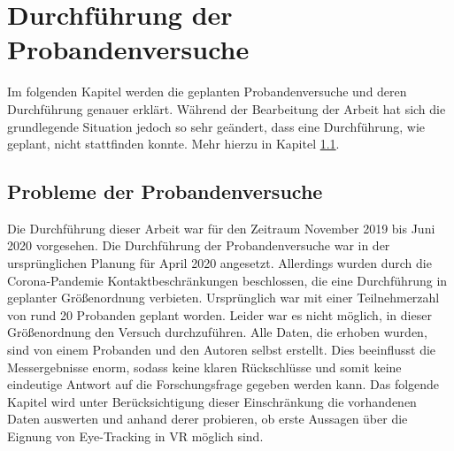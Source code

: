 
\chapter{Durchführung  der Probandenversuche} 
Im folgenden Kapitel werden die geplanten Probandenversuche und deren Durchführung genauer erklärt. Während der Bearbeitung der Arbeit hat sich die grundlegende Situation jedoch so sehr geändert, dass eine Durchführung, wie geplant, nicht stattfinden konnte. Mehr hierzu in Kapitel \ref{section:corona}.
\section{Probleme der Probandenversuche}
\label{section:corona}
Die Durchführung dieser Arbeit war für den Zeitraum November 2019 bis Juni 2020 vorgesehen. Die Durchführung der Probandenversuche war in der ursprünglichen Planung für April 2020 angesetzt. Allerdings wurden durch die Corona-Pandemie  Kontaktbeschränkungen beschlossen, die eine Durchführung in geplanter Größenordnung verbieten. Ursprünglich war mit einer Teilnehmerzahl von rund 20 Probanden geplant worden. Leider war es nicht möglich, in dieser Größenordnung den Versuch durchzuführen. Alle Daten, die erhoben wurden, sind von einem Probanden und den Autoren selbst erstellt. Dies beeinflusst die Messergebnisse enorm, sodass keine klaren Rückschlüsse und somit keine eindeutige Antwort auf die Forschungsfrage gegeben werden kann. Das folgende Kapitel wird unter Berücksichtigung dieser Einschränkung die vorhandenen Daten auswerten und anhand derer probieren, ob erste Aussagen über die Eignung von Eye-Tracking in VR möglich sind.
